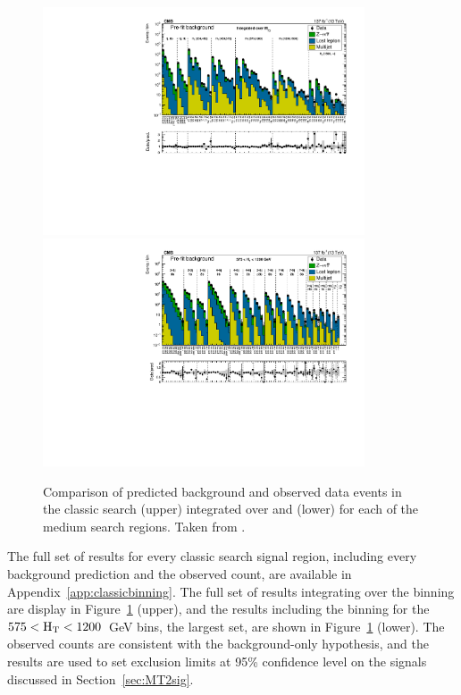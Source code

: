   \begin{figure}[h!]
    \centering
    \includegraphics[width=0.85\textwidth]{figures/MT2_2019/Figure_005-a.pdf}
    \includegraphics[width=0.85\textwidth]{figures/MT2_2019/Figure_005-b.pdf}
    \caption[Comparison of predicted background and observed data events in the classic search (upper) integrated over \Mttwo and (lower) for each of the medium \Ht search regions.]{Comparison of predicted background and observed data events in the classic search (upper) integrated over \Mttwo and (lower) for each of the medium \Ht search regions. Taken from \cite{MT2_2019}.}
    \label{fig:classicresults}
  \end{figure}  

  The full set of results for every classic search signal region, including every background prediction and the observed count, are available in Appendix~\ref{app:classicbinning}.
  The full set of results integrating over the \mttwo binning are display in Figure~\ref{fig:classicresults} (upper), and the results including the \mttwo binning for the $575 < \mathrm{H_{T}} < 1200$~GeV bins, the largest set, are shown in Figure~\ref{fig:classicresults} (lower).
  The observed counts are consistent with the background-only hypothesis, and the results are used to set exclusion limits at 95\% confidence level on the signals discussed in Section~\ref{sec:MT2sig}.

